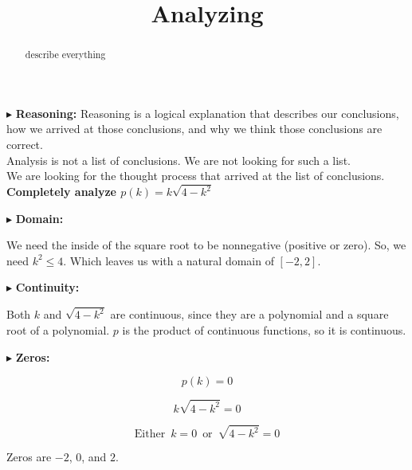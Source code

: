 \documentclass{ximera}
\title{Analyzing}
\begin{document}
\begin{abstract}
describe everything
\end{abstract}
\maketitle




$\blacktriangleright$ \textbf{\textcolor{red!80!black}{Reasoning:}} Reasoning is a logical explanation that describes our conclusions, how we arrived at those conclusions, and why we think those conclusions are correct. \\

Analysis is not a list of conclusions. We are not looking for such a list. \\

We are looking for the thought process that arrived at the list of conclusions. \\







\textbf{\textcolor{purple!85!blue}{Completely analyze $p(k) = k \sqrt{4-k^2}$}}






$\blacktriangleright$  \textbf{\textcolor{blue!55!black}{Domain:}} 

We need the inside of the square root to be nonnegative (positive or zero).  So, we need $k^2 \leq 4$. Which leaves us with a natural domain of $[-2, 2]$.





$\blacktriangleright$  \textbf{\textcolor{blue!55!black}{Continuity:}} 

Both $k$ and $\sqrt{4 - k^2}$ are continuous, since they are a polynomial and a square root of a polynomial.  $p$ is the product of continuous functions, so it is continuous.



$\blacktriangleright$  \textbf{\textcolor{blue!55!black}{Zeros:}} 


\[  p(k) = 0   \]

\[  k \sqrt{4-k^2} = 0  \]

\[
\text{Either } \, k = 0 \, \text{ or } \, \sqrt{4-k^2} = 0
\]


Zeros are $-2$, $0$, and $2$. \\
\end{document}
